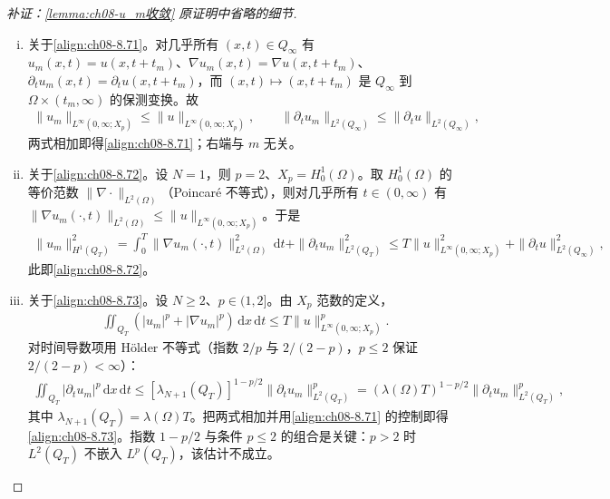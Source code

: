 \documentclass[../../main.tex]{subfiles}%
\begin{document}
\begin{proof}[补证：\cref{lemma:ch08-u_m收敛} 原证明中省略的细节]
\begin{enumerate}[(i)]
\item 关于\eqref{align:ch08-8.71}。对几乎所有 $(x,t)\in Q_\infty$ 有 $u_m(x,t)=u(x,t+t_m)$、$\nabla u_m(x,t)=\nabla u(x,t+t_m)$、$\partial_t u_m(x,t)=\partial_t u(x,t+t_m)$，而 $(x,t)\mapsto(x,t+t_m)$ 是 $Q_\infty$ 到 $\Omega\times(t_m,\infty)$ 的保测变换。故
\begin{align*}
\|u_m\|_{L^\infty(0,\infty;X_p)}\leqslant\|u\|_{L^\infty(0,\infty;X_p)},\qquad
\|\partial_t u_m\|_{L^2(Q_\infty)}\leqslant\|\partial_t u\|_{L^2(Q_\infty)},
\end{align*}
两式相加即得\eqref{align:ch08-8.71}；右端与 $m$ 无关。
\item 关于\eqref{align:ch08-8.72}。设 $N=1$，则 $p=2$、$X_p=H^1_0(\Omega)$。取 $H^1_0(\Omega)$ 的等价范数 $\|\nabla\cdot\|_{L^2(\Omega)}$（Poincaré 不等式），则对几乎所有 $t\in(0,\infty)$ 有 $\|\nabla u_m(\cdot,t)\|_{L^2(\Omega)}\leqslant\|u\|_{L^\infty(0,\infty;X_p)}$。于是
\begin{align*}
\|u_m\|^2_{H^1(Q_T)}=\int_0^T\|\nabla u_m(\cdot,t)\|^2_{L^2(\Omega)}\,\mathrm{d}t+\|\partial_t u_m\|^2_{L^2(Q_T)}
\leqslant T\|u\|^2_{L^\infty(0,\infty;X_p)}+\|\partial_t u\|^2_{L^2(Q_\infty)},
\end{align*}
此即\eqref{align:ch08-8.72}。
\item 关于\eqref{align:ch08-8.73}。设 $N\geqslant2$、$p\in(1,2]$。由 $X_p$ 范数的定义，
\begin{align*}
\iint_{Q_T}(|u_m|^p+|\nabla u_m|^p)\,\mathrm{d}x\,\mathrm{d}t\leqslant T\|u\|^p_{L^\infty(0,\infty;X_p)}.
\end{align*}
对时间导数项用 Hölder 不等式（指数 $2/p$ 与 $2/(2-p)$，$p\leqslant2$ 保证 $2/(2-p)<\infty$）：
\begin{align*}
\iint_{Q_T}|\partial_t u_m|^p\,\mathrm{d}x\,\mathrm{d}t
\leqslant[\lambda_{N+1}(Q_T)]^{1-p/2}\|\partial_t u_m\|^p_{L^2(Q_T)}
=(\lambda(\Omega)T)^{1-p/2}\|\partial_t u_m\|^p_{L^2(Q_T)},
\end{align*}
其中 $\lambda_{N+1}(Q_T)=\lambda(\Omega)T$。把两式相加并用\eqref{align:ch08-8.71} 的控制即得\eqref{align:ch08-8.73}。指数 $1-p/2$ 与条件 $p\leqslant2$ 的组合是关键：$p>2$ 时 $L^2(Q_T)$ 不嵌入 $L^p(Q_T)$，该估计不成立。

\end{enumerate}
\end{proof}
\end{document}
